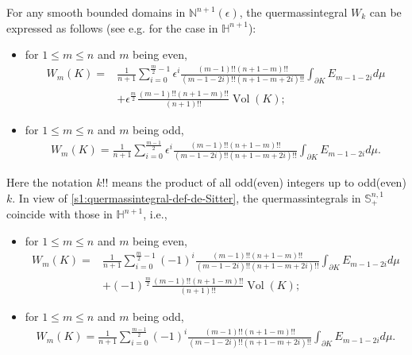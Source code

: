 \documentclass[11pt,reqno]{amsart}
\theoremstyle{definition}
\theoremstyle{remark}
\numberwithin{equation}{section}
\renewcommand{\(}{\left(}
\renewcommand{\)}{\right)}
\renewcommand{\~}{\tilde}
\renewcommand{\-}{\overline}
\newcommand{\e}{\epsilon}
\newcommand{\Vol}{\operatorname{Vol}}
\begin{document}
For any smooth bounded domains in $\mathbb N^{n+1}(\e)$, the quermassintegral $W_k$ can be expressed as follows (see e.g. \cite[Corollary 8]{Solanes06} for the case in $\mathbb H^{n+1}$):
\begin{itemize} 
	\item for $1\leq m\leq n$ and $m$ being even,
	\begin{align}\label{s3:quermassintegral-expression-even}
	W_m(K)=&\frac{1}{n+1}\sum_{i=0}^{\frac{m}{2}-1}\e^i \frac{(m-1)!!(n+1-m)!!}{(m-1-2i)!!(n+1-m+2i)!!}\int_{\partial K}E_{m-1-2i}d\mu \nonumber\\
	&+\e^{\frac{m}{2}}\frac{(m-1)!!(n+1-m)!!}{(n+1)!!}\Vol(K);
	\end{align}
	\item for $1\leq m\leq n$ and $m$ being odd,
	\begin{align}\label{s3:quermassintegral-expression-odd}
	W_m(K)=\frac{1}{n+1}\sum_{i=0}^{\frac{m-1}{2}}\e^i \frac{(m-1)!!(n+1-m)!!}{(m-1-2i)!!(n+1-m+2i)!!}\int_{\partial K}E_{m-1-2i}d\mu.
	\end{align}
\end{itemize}
Here the notation $k!!$ means the product of all odd(even) integers up to odd(even) $k$. In view of \eqref{s1:quermassintegral-def-de-Sitter}, the quermassintegrals in $\mathbb S^{n,1}_{+}$ coincide with those in $\mathbb H^{n+1}$, i.e.,
\begin{itemize} 
	\item for $1\leq m\leq n$ and $m$ being even,
	\begin{align}\label{s3:quermassintegral-expression-even-de-Sitter}
	W_m(K)=&\frac{1}{n+1}\sum_{i=0}^{\frac{m}{2}-1}(-1)^i \frac{(m-1)!!(n+1-m)!!}{(m-1-2i)!!(n+1-m+2i)!!}\int_{\partial K}E_{m-1-2i}d\mu \nonumber\\
	&+(-1)^{\frac{m}{2}}\frac{(m-1)!!(n+1-m)!!}{(n+1)!!}\Vol(K);
	\end{align}
	\item for $1\leq m\leq n$ and $m$ being odd,
	\begin{align}\label{s3:quermassintegral-expression-odd-de-Sitter}
	W_m(K)=\frac{1}{n+1}\sum_{i=0}^{\frac{m-1}{2}}(-1)^i \frac{(m-1)!!(n+1-m)!!}{(m-1-2i)!!(n+1-m+2i)!!}\int_{\partial K}E_{m-1-2i}d\mu.
	\end{align}
\end{itemize}
\end{document}
